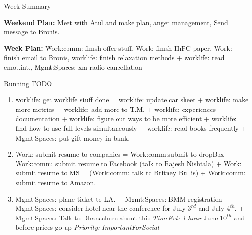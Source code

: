 \documentclass[serif, mathserif, final]{beamer}
\newcommand{\doneTask}[1]{\tiny \item \tiny \sout{#1}}
\newcommand{\te}[1]{\textit{TimeEst:} \textit{#1}}
\newcommand{\prio}[1]{\textit{Priority:} \textit{#1}}
\newcommand{\dl}[1]{#1}
\begin{document}
\begin{frame}{}
\begin{columns}
\begin{column}{0.50\linewidth}
\begin{block}{Week Summary}
        

          {\tiny \textbf{Weekend Plan:}  Meet with Atul and make plan,
            anger management, Send message to Bronis.}

        {\tiny \textbf{Week Plan:} Work:comm: finish offer stuff,
          Work: finish HiPC paper, Work: finish email to Bronis,
          worklife: finish relaxation methods + worklife: read
          emot.int., Mgmt:Spaces: xm radio cancellation}


      \end{block} 
      
      \begin{block}{Running TODO} %
        \begin{enumerate} 
        \item \small worklife: get worklife stuff done =  worklife:
          update car sheet + worklife: make more metrics + worklife:
          add more to T.M. + worklife: experiences documentation +
          worklife: figure out ways to be more efficient + worklife:
          find how to use full levels simultaneously + worklife: read
          books frequently + Mgmt:Spaces: put gift money in bank. 

      \item \small Work: submit resume to companies  =
        Work:comm:submit to dropBox + Work:comm: submit resume to Facebook (talk
        to Rajesh Nishtala) + Work: submit
        resume to MS = (Work:comm: talk to Britney Bullis) +
        Work:comm: submit resume to Amazon. 

      \item \small Mgmt:Spaces: plane ticket to LA.  + Mgmt:Spaces:
        BMM registration + Mgmt:Spaces: consider hotel near the
        conference for July $3^{rd}$ and July $4^{th}$.  +
        Mgmt:Spaces: Talk to Dhanashree about this \te{1 hour}
        \dl{June $10^{th}$ and before prices go up}
        \prio{ImportantForSocial} 


\end{enumerate}
\end{block}
\end{column}
\end{columns}
\end{frame}
\end{document}
